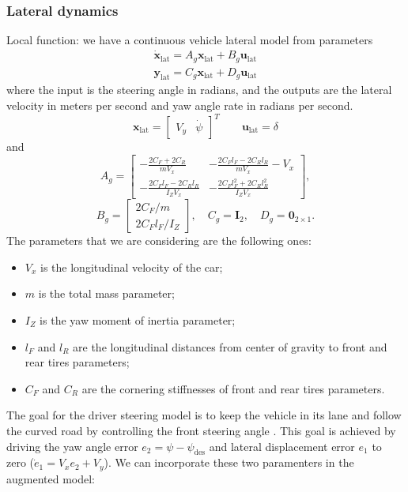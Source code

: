 \documentclass[conference, 11pt]{IEEEtran}
\begin{document}
\subsubsection{Lateral dynamics}
Local function: we have a continuous vehicle lateral model from parameters
\begin{equation}
\label{eqn:lateral_dynamics_simple_model}
\begin{array}{ll}
\dot{\textbf{x}}_{\text{lat}} =A_g \textbf{x}_{\text{lat}}+ B_g \textbf{u}_{\text{lat}}\\
\textbf{y}_{\text{lat}} =C_g \textbf{x}_{\text{lat}} + D_g \textbf{u}_{\text{lat}}
\end{array}
\end{equation}
where the input is the steering angle in radians, and the outputs are the lateral velocity in meters per second and yaw angle rate in radians per second.
\begin{equation*}
\textbf{x}_{\text{lat}} = \begin{bmatrix}
V_y&\dot{\psi}
\end{bmatrix}^T
\qquad
\textbf{u}_{\text{lat}} = \delta
\end{equation*}
and
\[ 
A_g=\begin{bmatrix}
-\frac{2C_F+2C_R}{mV_x}&-\frac{2C_Fl_F-2C_Rl_R}{mV_x} - V_x\\
-\frac{2C_Fl_F-2C_Rl_R}{I_ZV_x}&-\frac{2C_Fl_F^2+2C_Rl_R^2}{I_ZV_x}
\end{bmatrix},
\]
\[
B_g=\begin{bmatrix}
2C_F/m\\
2C_Fl_F/I_Z
\end{bmatrix},
\quad
C_g=\textbf{I}_2, 
\quad
D_g=\textbf{0}_{2\times1}.
\]
The parameters that we are considering are the following ones:
\begin{itemize}
	\item $V_x$ is the longitudinal velocity of the car;	
	\item $m$ is the total mass parameter; 
	\item $I_Z$ is the yaw moment of inertia parameter;
	\item $l_F$ and $l_R$ are the longitudinal distances from center of gravity to front and rear tires parameters;
	\item $C_F$ and $C_R$ are the cornering stiffnesses of front and rear tires parameters.
\end{itemize}
The goal for the driver steering model is to keep the vehicle in its lane and follow the curved road by controlling the front steering angle . This goal is achieved by driving the yaw angle error $e_2 = \psi -\psi_{\text{des}}$ and lateral displacement error $e_1$ to zero ($\dot{e}_1 = V_xe_2+V_y$). We can incorporate these two paramenters in the augmented model:
\end{document}
